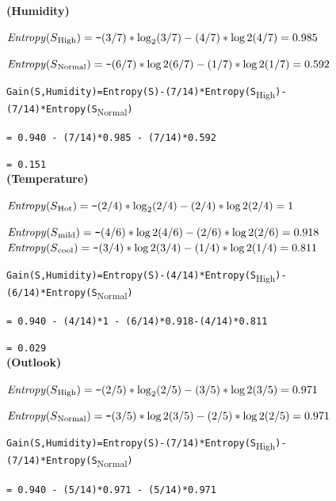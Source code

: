 \documentclass{report}
\newcommand\textstyleTeletype[1]{\texttt{#1}}
\begin{document}
{\bf (Humidity)}

$\mathit{Entropy}(S\textsubscript{High}) = \textstyleTeletype{{}-} (3/7)*\log_{2}(3/7)
{}- (4/7)*\log{2}(4/7) = 0.985$

$\mathit{Entropy}(S\textsubscript{Normal}) = \textstyleTeletype{{}-}
(6/7)*\log{2}(6/7) {}- (1/7)*\log{2}(1/7) = 0.592$\\

{\centering
\textstyleTeletype{Gain(S,Humidity)=Entropy(S){}-(7/14)*Entropy(S}\textsubscript{High}\textstyleTeletype{){}-(7/14)*Entropy(S}\textsubscript{Normal}\textstyleTeletype{)}
\par}
\textstyleTeletype{= 0.940 {}- (7/14)*0.985 {}- (7/14)*0.592}

\textstyleTeletype{= 0.151}\\

{\bf (Temperature)}

$\mathit{Entropy}(S\textsubscript{Hot}) = \textstyleTeletype{{}-} (2/4)*\log_{2}(2/4)
{}- (2/4)*\log{2}(2/4) = 1$

$\mathit{Entropy}(S\textsubscript{mild}) = \textstyleTeletype{{}-}
(4/6)*\log{2}(4/6) {}- (2/6)*\log{2}(2/6) = 0.918$\\

$\mathit{Entropy}(S\textsubscript{cool}) = \textstyleTeletype{{}-}
(3/4)*\log{2}(3/4) {}- (1/4)*\log{2}(1/4) = 0.811$\\

{\centering
\textstyleTeletype{Gain(S,Humidity)=Entropy(S){}-(4/14)*Entropy(S}\textsubscript{High}\textstyleTeletype{){}-(6/14)*Entropy(S}\textsubscript{Normal}\textstyleTeletype{)}
\par}
\textstyleTeletype{= 0.940 {}- (4/14)*1 {}- (6/14)*0.918{}-(4/14)*0.811}

\textstyleTeletype{= 0.029}\\



{\bf(Outlook)}

$\mathit{Entropy}(S\textsubscript{High}) = \textstyleTeletype{{}-} (2/5)*\log_{2}(2/5)
{}- (3/5)*\log{2}(3/5) = 0.971$

$\mathit{Entropy}(S\textsubscript{Normal}) = \textstyleTeletype{{}-}
(3/5)*\log{2}(3/5) {}- (2/5)*\log{2}(2/5) = 0.971$\\

{\centering
\textstyleTeletype{Gain(S,Humidity)=Entropy(S){}-(7/14)*Entropy(S}\textsubscript{High}\textstyleTeletype{){}-(7/14)*Entropy(S}\textsubscript{Normal}\textstyleTeletype{)}
\par}
\textstyleTeletype{= 0.940 {}- (5/14)*0.971 {}- (5/14)*0.971}
\end{document}
